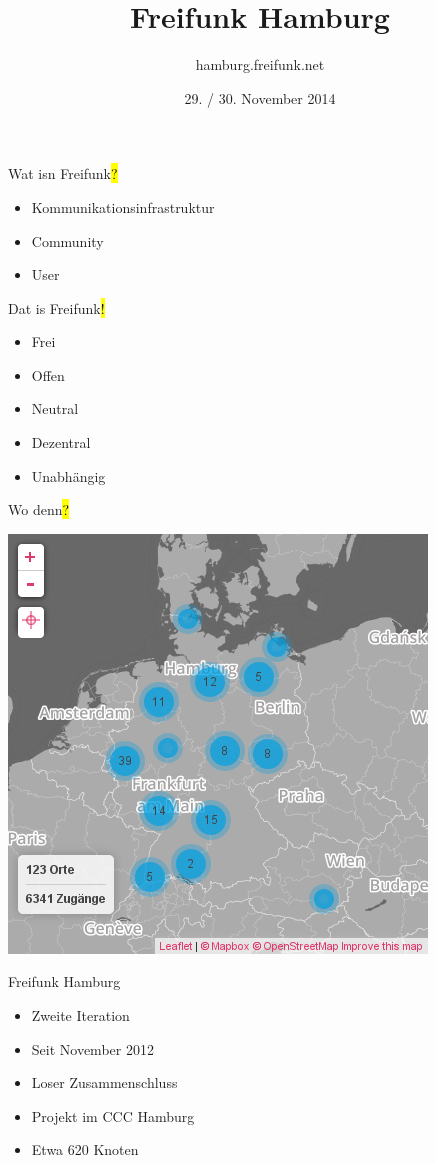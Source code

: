 \documentclass[t]{beamer}
\title{Freifunk Hamburg}
\author{hamburg.freifunk.net}
\date{29. / 30. November 2014}
\begin{document}
\maketitle

\begin{frame}{Wat isn Freifunk\hl{?}}
    \begin{itemize}
        \item Kommunikationsinfrastruktur
        \item Community
        \item User
    \end{itemize}
\end{frame}

\begin{frame}{Dat is Freifunk\hl{!}}
    \begin{itemize}
        \item Frei
        \item Offen
        \item Neutral
        \item Dezentral
        \item Unabhängig
    \end{itemize}
\end{frame}

\begin{frame}{Wo denn\hl{?}}
    \begin{center}
        \includegraphics[width=.5\textwidth]{Bilder/community-map-2014-11-16}
    \end{center}
\end{frame}

\begin{frame}{Freifunk Hamburg\ANKER{}}
    \begin{itemize}
        \item Zweite Iteration
        \item Seit November 2012
        \item Loser Zusammenschluss
        \item Projekt im CCC Hamburg
        \item Etwa 620 Knoten
    \end{itemize}
\end{frame}
\end{document}

